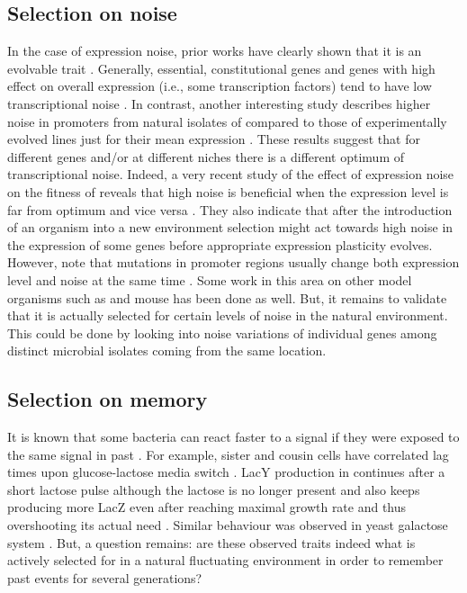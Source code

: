 \subsection{Selection on noise}
In the case of expression noise, prior works have clearly shown that it is an evolvable trait \cite{richard2014does}.
Generally, essential, constitutional genes and genes with high effect on overall expression (i.e., some transcription factors) tend to have low transcriptional noise \cite{silander2012genome, metzger2015selection}.
In contrast, another interesting study describes higher noise in promoters from natural isolates of  compared to those of experimentally evolved lines just for their mean expression \cite{wolf2015expression}.
These results suggest that for different genes and/or at different niches there is a different optimum of transcriptional noise.
Indeed, a very recent study of the effect of expression noise on the fitness of  reveals that high noise is beneficial when the expression level is far from optimum and vice versa \cite{duveau2018fitness}.
They also indicate that after the introduction of an organism into a new environment selection might act towards high noise in the expression of some genes before appropriate expression plasticity evolves.
However, note that mutations in promoter regions usually change both expression level and noise at the same time \cite{metzger2015selection}.
Some work in this area on other model organisms such as  \cite{schor2017promoter} and mouse \cite{barroso2017evolution} has been done as well.
But, it remains to validate that it is actually selected for certain levels of noise in the natural environment.
This could be done by looking into noise variations of individual genes among distinct microbial isolates coming from the same location.

\subsection{Selection on memory}
It is known that some bacteria can react faster to a signal if they were exposed to the same signal in past \cite{novick1957enzyme}.
For example, sister and cousin cells have correlated lag times upon glucose-lactose media switch \cite{boulineau2013single, kaiser2018monitoring}.
LacY production in  continues after a short lactose pulse although the lactose is no longer present \cite{lambert2014memory} and  also keeps producing more LacZ even after reaching maximal growth rate and thus overshooting its actual need \cite{kaiser2018monitoring}.
Similar behaviour was observed in yeast galactose system \cite{zacharioudakis2007yeast, razinkov2013measuring}.
But, a question remains: are these observed traits indeed what is actively selected for in a natural fluctuating environment in order to remember past events for several generations?

